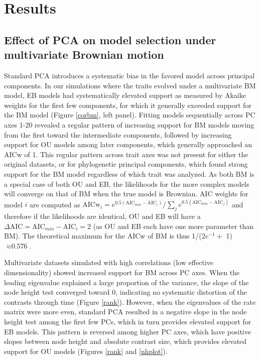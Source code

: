 \documentclass[a4paper,11pt]{article}
\begin{document}
\section{Results}
\subsection{Effect of PCA on model selection under multivariate Brownian motion}
Standard PCA introduces a systematic bias in the favored model across principal components. In our simulations where the traits evolved under a multivariate BM model, EB models had systematically elevated support as measured by Akaike weights for the first few components, for which it generally exceeded support for the BM model (Figure \ref{corbm}, left panel). Fitting models sequentially across PC axes 1-20 revealed a regular pattern of increasing support for BM models moving from the first toward the intermediate components, followed by increasing support for OU models among later components, which generally approached an AICw of 1. This regular pattern across trait axes was not present for either the original datasets, or for phylogenetic principal components, which found strong support for the BM model regardless of which trait was analyzed. As both BM is a special case of both OU and EB, the likelihoods for the more complex models will converge on that of BM when the true model is Brownian. AIC weights for model $i$ are computed as
$\text{AICw}_i = e^{\text{0.5}(\text{AIC}_{min} - \text{AIC}_i)}/\sum_j e^{\text{0.5}(\text{AIC}_{min} - \text{AIC}_j)}$
and therefore if the likelihoods are identical, OU and EB will have a $\Delta \text{AIC} = \text{AIC}_{min} - \text{AIC}_i = \text{2}$ (as OU and EB each have one more parameter than BM). The theoretical maximum for the AICw of BM is thus 1/(2$e^{-\text{1}} +$ 1) $\approx \text{0.576}$.
 
Multivariate datasets simulated with high correlations (low effective dimensionality) showed increased support for BM across PC axes. When the leading eigenvalue explained a large proportion of the variance, the slope of the node height test converged toward 0, indicating no systematic distortion of the contrasts through time (Figure \ref{rank}). However, when the eigenvalues of the rate matrix were more even, standard PCA resulted in a negative slope in the node height test among the first few PCs, which in turn provides elevated support for EB models. This pattern is reversed among higher PC axes, which have positive slopes between node height and absolute contrast size, which provides elevated support for OU models (Figures \ref{rank} and \ref{nhplot}). 
\end{document}
